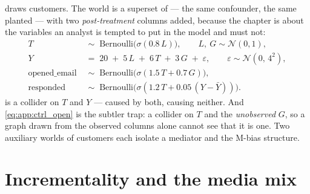  draws \nbFiveN{} customers. The world is a superset of
 --- the same confounder, the same planted
\eur{\nbFiveTrueAte} --- with two \emph{post-treatment} columns added, because the chapter is about
the variables an analyst is tempted to put in the model and must not:
%
\begin{align}
  T &\;\sim\; \text{Bernoulli}\big(\sigma(0.8\,L)\big),
      \qquad L,\ G \sim \mathcal N(0,1), \label{eq:app:ctrl_t}\\
  Y &\;=\; 20 \;+\; 5\,L \;+\; 6\,T \;+\; 3\,G \;+\; \varepsilon,
      \qquad \varepsilon \sim \mathcal N(0,\,4^{2}), \label{eq:app:ctrl_y}\\
  \text{opened\_email} &\;\sim\; \text{Bernoulli}\big(\sigma(1.5\,T + 0.7\,G)\big),
      \label{eq:app:ctrl_open}\\
  \text{responded} &\;\sim\; \text{Bernoulli}\big(\sigma(1.2\,T + 0.05\,(Y - \bar Y))\big).
      \label{eq:app:ctrl_resp}
\end{align}
%
 is a collider on $T$ and $Y$ --- caused by both, causing neither. And
\cref{eq:app:ctrl_open} is the subtler trap: a collider on $T$ and the \emph{unobserved} $G$, so a
graph drawn from the observed columns alone cannot see that it is one. Two auxiliary worlds of
\nbFiveMiniN{} customers each isolate a mediator and the M-bias structure.

\section{Incrementality and the media mix}
\label{app:dgp:mmm}

